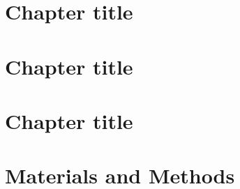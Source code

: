 \documentclass[english,11pt,twoside,list=totoc]{book}
\begin{document}
	\chapter{Chapter title} %
			
	\chapter{Chapter title} %
			
	\chapter{Chapter title} %
		
	\chapter{Materials and Methods}
		
		
		
	
\end{document}
